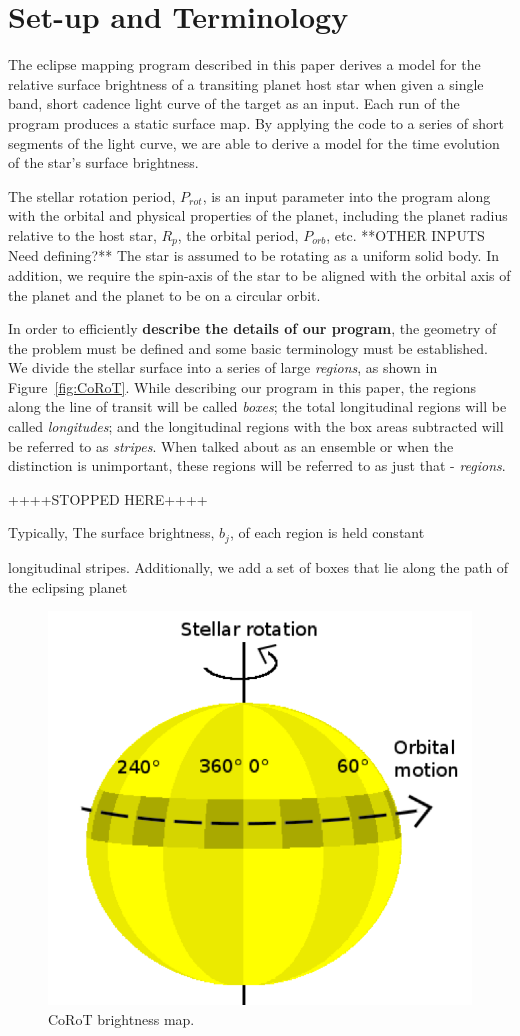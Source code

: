 

\section{Set-up and Terminology \label{terminology}}
The eclipse mapping program described in this paper derives a model for the relative surface brightness of a transiting planet host star when given a single band, short cadence light curve of the target as an input.  Each run of the program produces a static surface map. By applying the code to a series of short segments of the light curve, we are able to derive a model for the time evolution of the star's surface brightness.  

The stellar rotation period, $P_{rot}$, is an input parameter into the program along with the orbital and physical properties of the planet, including the
planet radius relative to the host star, $R_{p}$, the orbital period, $P_{orb}$, etc.   **OTHER INPUTS Need defining?**
The star is assumed to be rotating as a uniform solid body.  In addition, we require the spin-axis of the star   
to be aligned with the orbital axis of the planet and the planet to be on a circular orbit.  

In order to efficiently {\bf describe the details of our program}, the geometry
of the problem must be defined and some basic terminology must be established.
We divide the stellar surface into a series of large {\it regions}, as shown in Figure~\ref{fig:CoRoT}.  
While describing our program in this paper, the regions along the line of transit will be called {\it boxes}; 
the total longitudinal regions will be called {\it longitudes};
and the longitudinal regions with the box areas subtracted will be referred to as {\it stripes}.
When talked about as an ensemble or when the distinction is unimportant, these regions will be referred to as just that - {\it regions}. 

++++STOPPED HERE++++

Typically, 
The surface brightness, $b_j$, of
each region is held constant 

longitudinal stripes. Additionally, we add a set of boxes that lie along the path of the eclipsing planet

\begin{figure}[h]
	\centering
	\includegraphics[width=.5\textwidth]{images/modelGeometry.png}
	\caption{CoRoT brightness map.}
	\label{CoRoT}
\end{figure}


